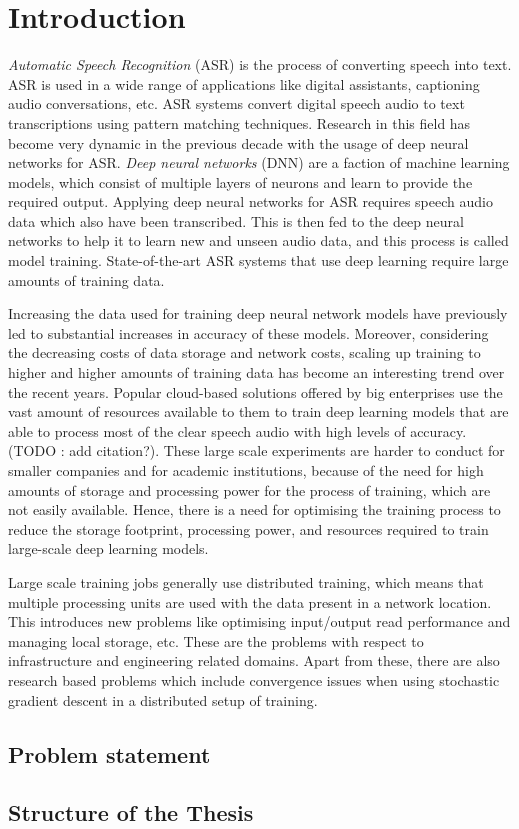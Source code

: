 \chapter{Introduction}
\label{chapter:intro}
\emph{Automatic Speech Recognition} (ASR) is the process of converting speech into text. ASR is used in a wide range of applications like digital assistants,  captioning audio conversations, etc. ASR systems convert digital speech audio to text transcriptions using pattern matching techniques. Research in this field has become very dynamic in the previous decade with the usage of deep neural networks for ASR. \emph{Deep neural networks} (DNN) are a faction of machine learning models, which consist of multiple layers of neurons and learn to provide the required output. Applying deep neural networks for ASR requires speech audio data which also have been transcribed. This is then fed to the deep neural networks to help it to learn new and unseen audio data, and this process is called model training. State-of-the-art ASR systems that use deep learning require large amounts of training data. 

Increasing the data used for training deep neural network models have previously led to substantial increases in accuracy of these models. Moreover, considering the decreasing costs of data storage and network costs, scaling up training to higher and higher amounts of training data has become an interesting trend over the recent years. Popular cloud-based solutions offered by big enterprises use the vast amount of resources available to them to train deep learning models that are able to process most of the clear speech audio with high levels of accuracy. (TODO : add citation?). These large scale experiments are harder to conduct for smaller companies and for academic institutions, because of the need for high amounts of storage and processing power for the process of training, which are not easily available. Hence, there is a need for optimising the training process to reduce the storage footprint, processing power, and resources required to train large-scale deep learning models.

Large scale training jobs generally use distributed training, which means that multiple processing units are used with the data present in a network location. This introduces new problems like optimising input/output read performance and managing local storage, etc. These are the problems with respect to infrastructure and engineering related domains. Apart from these, there are also research based problems which include convergence issues when using stochastic gradient descent in a distributed setup of training.  



\section{Problem statement}




\section{Structure of the Thesis}
\label{section:structure} 


